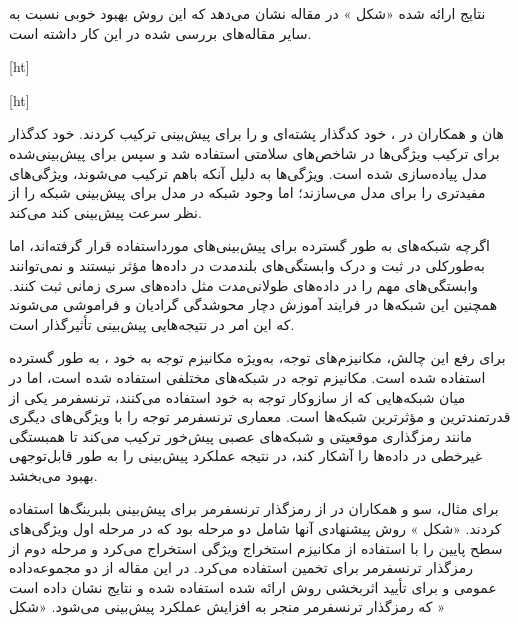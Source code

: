 نتایج ارائه شده «شکل » در مقاله نشان می‌دهد که این روش بهبود خوبی نسبت به سایر مقاله‌های بررسی شده در این کار داشته است.



[ht]



[ht]



 هان و همکاران در ، خود کدگذار پشته‌ای و  را برای پیش‌بینی  ترکیب کردند. خود کدگذار برای ترکیب ویژگی‌ها در شاخص‌های سلامتی استفاده شد و سپس  برای پیش‌بینی‌شده مدل پیاده‌سازی شده است. ویژگی‌ها به دلیل آنکه باهم ترکیب می‌شوند، ویژگی‌های مفیدتری را برای مدل می‌سازند؛ اما وجود شبکه  در مدل برای پیش‌بینی شبکه را از نظر سرعت پیش‌بینی کند می‌کند.
 
 
 
 
 
 اگرچه شبکه‌های  به طور گسترده برای پیش‌بینی‌های  مورداستفاده قرار گرفته‌اند، اما به‌طورکلی در ثبت و درک وابستگی‌های بلندمدت در داده‌ها مؤثر نیستند و نمی‌توانند وابستگی‌های مهم را در داده‌های طولانی‌مدت مثل داده‌های سری زمانی ثبت کنند. همچنین این شبکه‌ها در فرایند آموزش دچار محوشدگی گرادیان و فراموشی می‌شوند که این امر در نتیجه‌هایی پیش‌بینی تأثیرگذار است.
 
 
 
برای رفع این چالش، مکانیزم‌های توجه، به‌ویژه مکانیزم توجه به خود ، به طور گسترده استفاده شده است. مکانیزم توجه در شبکه‌های مختلفی استفاده شده است، اما در میان شبکه‌هایی که از سازوکار توجه به خود استفاده می‌کنند، ترنسفرمر یکی از قدرتمندترین و مؤثرترین شبکه‌ها است. معماری ترنسفرمر توجه را با ویژگی‌های دیگری مانند رمزگذاری موقعیتی و شبکه‌های عصبی پیش‌خور ترکیب می‌کند تا همبستگی غیرخطی در داده‌ها را آشکار کند، در نتیجه عملکرد پیش‌بینی را به طور قابل‌توجهی بهبود می‌بخشد.




برای مثال، سو و همکاران در  از رمزگذار ترنسفرمر برای پیش‌بینی  بلبرینگ‌ها استفاده کردند. «شکل » روش پیشنهادی آنها شامل دو مرحله بود که در مرحله اول ویژگی‌های سطح پایین را با استفاده از مکانیزم استخراج ویژگی استخراج می‌کرد و مرحله دوم از رمزگذار ترنسفرمر برای تخمین  استفاده می‌کرد. در این مقاله از دو مجموعه‌داده عمومی  و  برای تأیید اثربخشی روش ارائه شده استفاده شده و نتایج نشان داده است که رمزگذار ترنسفرمر منجر به افزایش عملکرد پیش‌بینی می‌شود. «شکل »



